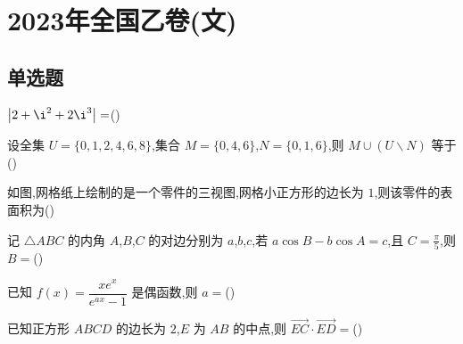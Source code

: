 \chapter{2023年全国乙卷(文)}

\section{单选题}

\begin{problem}
\(\left|2+\i^2+2\i^3\right|=\)(\quad)

\end{problem}

\begin{problem}
设全集 \(U=\{0,1,2,4,6,8\}\),集合 \(M=\{0,4,6\}\),\(N=\{0,1,6\}\),则 \(M\cup(U\mathbin{\backslash}N)\) 等于(\quad)

\end{problem}

\begin{problem}
如图,网格纸上绘制的是一个零件的三视图,网格小正方形的边长为 \(1\),则该零件的表面积为(\quad)
\begin{center}\end{center}

\end{problem}

\begin{problem}
记 \(\triangle ABC\) 的内角 \(A\),\(B\),\(C\) 的对边分别为 \(a\),\(b\),\(c\),若 \(a\cos B-b\cos A=c\),且 \(C=\frac\pi5\),则 \(B=\)(\quad)

\end{problem}

\begin{problem}
已知 \(f(x)=\dfrac{xe^x}{e^{ax}-1}\) 是偶函数,则 \(a=\)(\quad)

\end{problem}

\begin{problem}
已知正方形 \(ABCD\) 的边长为 \(2\),\(E\) 为 \(AB\) 的中点,则 \(\overrightarrow{EC}\cdot\overrightarrow{ED}=\)(\quad)

\end{problem}

